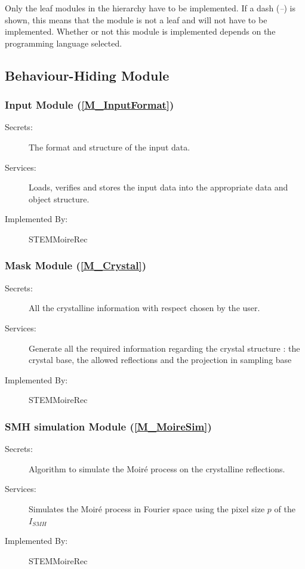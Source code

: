 \documentclass[12pt, titlepage]{article}
\newcommand{\progname}{STEMMoireRec}
\begin{document}
Only the leaf modules in the
hierarchy have to be implemented. If a dash (\emph{--}) is shown, this means
that the module is not a leaf and will not have to be implemented. Whether or
not this module is implemented depends on the programming language
selected.


\subsection{Behaviour-Hiding Module}

\subsubsection{Input Module (\texorpdfstring{\cref{M_InputFormat}}))}
\label{MG_InputFormat}
\begin{description}
\item[Secrets:] The format and structure of the input data.
\item[Services:] Loads, verifies and stores the input data into the appropriate 
data and object structure.
\item[Implemented By:] \progname{}
\end{description}

\subsubsection{Mask Module (\texorpdfstring{\cref{M_Crystal}}))}
\label{MG_Crystal}
\begin{description}
\item[Secrets:] All the crystalline information with respect chosen by the user.
\item[Services:] Generate all the required information regarding the crystal structure : the crystal base, the allowed reflections and the projection in sampling base
\item[Implemented By:] \progname{}
\end{description}

\subsubsection{SMH simulation Module (\texorpdfstring{\cref{M_MoireSim}}))}
\label{MG_MoireSim}
\begin{description}
\item[Secrets:] Algorithm to simulate the Moir{\'e} process on the crystalline reflections.
\item[Services:] Simulates the Moir{\'e} process in Fourier space using the pixel size $p$ of the $I_{SMH}$
\item[Implemented By:] \progname{}
\end{description}
\end{document}
